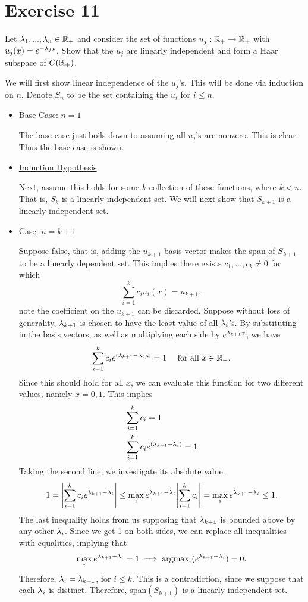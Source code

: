 \newpage
\section{Exercise 11}
Let $\mathrm{\lambda}_1, ..., \mathrm{\lambda}_n \in \mathbb{R}_+$ and consider the set of functions $u_j: \mathbb{R}_+ \to \mathbb{R}_+$ with $u_j(x) = e^{-\mathrm{\lambda}_j x}$. Show that the $u_j$ are linearly independent and form a Haar subspace of $C(\mathbb{R}_+)$. 
\partbreak
\begin{solution}


    We will first show linear independence of the $u_j$'s. This will be done via induction on $n$. Denote $S_n$ to be the set containing the $u_i$ for $i \leq n$. 
    \begin{itemize}
        \item \underline{Base Case}: $n = 1$

        \hop
        The base case just boils down to assuming all $u_j$'s are nonzero. This is clear. Thus the base case is shown.

        \item \underline{Induction Hypothesis}

        \hop 
        Next, assume this holds for some $k$ collection of these functions, where $k<n$. That is, $S_k$ is a linearly independent set. We will next show that $S_{k+1}$ is a linearly independent set.

        \item \underline{Case}: $n = k+1$

        \hop
        Suppose false, that is, adding the $u_{k+1}$ basis vector makes the span of $S_{k+1}$ to be a linearly dependent set. This implies there exists $c_1, ..., c_k \neq 0$ for which
        \[\sum_{i = 1}^k c_iu_i(x) = u_{k+1},\]
        note the coefficient on the $u_{k+1}$ can be discarded. Suppose without loss of generality, $\mathrm{\lambda}_{k+1}$ is chosen to have the least value of all $\mathrm{\lambda}_i$'s. By substituting in the basis vectors, as well as multiplying each side by $e^{\mathrm{\lambda}_{k+1}x}$, we have
        \[\sum_{i = 1}^k c_ie^{(\mathrm{\lambda}_{k+1} - \mathrm{\lambda}_i)x} = 1 \quad \text{ for all } x \in \mathbb{R}_+.\]
        Since this should hold for all $x$, we can evaluate this function for two different values, namely $x = 0, 1$. This implies 
        \begin{align*}
            &\sum_{i = 1}^k c_i = 1\\
            &\sum_{i = 1}^k c_i e^{(\mathrm{\lambda}_{k+1} - \mathrm{\lambda}_i)} = 1
        \end{align*}
        Taking the second line, we investigate its absolute value. 
        \[1 = \abs{\sum_{i = 1}^k c_i e^{\mathrm{\lambda}_{k+1} - \mathrm{\lambda}_i}} \leq \max_i e^{\mathrm{\lambda}_{k+1} - \mathrm{\lambda}_i} \abs{\sum_{i = 1}^k c_i} = \max_i e^{\mathrm{\lambda}_{k+1} - \mathrm{\lambda}_i} \leq 1.\]
        The last inequality holds from us supposing that $\mathrm{\lambda}_{k+1}$ is bounded above by any other $\mathrm{\lambda}_i$. Since we get 1 on both sides, we can replace all inequalities with equalities, implying that 
        \[\max_i e^{\mathrm{\lambda}_{k+1} - \mathrm{\lambda}_i} = 1 \implies \text{argmax}_i (e^{\mathrm{\lambda}_{k+1} - \mathrm{\lambda}_i}) = 0.\]
        Therefore, $\mathrm{\lambda}_i = \mathrm{\lambda}_{k+1}$, for $i \leq k$. This is a contradiction, since we suppose that each $\mathrm{\lambda}_i$ is distinct. Therefore, span$(S_{k+1})$ is a linearly independent set. 
    \end{itemize}


\end{solution}
